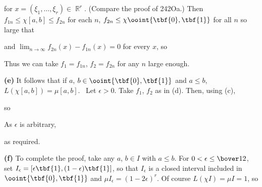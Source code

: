 { 
      
      
\noindent for $x=(\xi_1,\ldots,\xi_r)\in\BbbR^r$.   (Compare the proof 
of 242Oa.)   Then 
$f_{1n}\le\chi[a,b]\le f_{2n}$ for each $n$, 
$f_{2n}\le\chi\ooint{\tbf{0},\tbf{1}}$ for all $n$ so large that 
      
      
\noindent and $\lim_{n\to\infty}f_{2n}(x)-f_{1n}(x)=0$ for every $x$, so 
      
      
\noindent Thus we can take $f_1=f_{1n}$, $f_2=f_{2n}$ for any $n$ large 
enough.   \Qed 
      
\medskip 
      
{\bf (e)} It follows that if $a$, $b\in\ooint{\tbf{0},\tbf{1}}$ and 
$a\le b$, $L(\chi[a,b])=\mu[a,b]$.   \Prf\ Let $\epsilon>0$.   Take 
$f_1$, $f_2$ as in (d).   Then, using (c), 
      
      
      
\noindent so 
      
      
\noindent   As $\epsilon$ is arbitrary, 
      
      
\noindent as required.\ \Qed 
      
\medskip 
      
{\bf (f)} To complete the proof, take any $a$, $b\in I$ with $a\le b$. 
For $0<\epsilon\le\bover12$, set 
$I_{\epsilon}=[\epsilon\tbf{1},(1-\epsilon)\tbf{1}]$, so that 
$I_{\epsilon}$ is a closed interval included in 
$\ooint{\tbf{0},\tbf{1}}$ and $\mu I_{\epsilon}=(1-2\epsilon)^r$.   Of 
course $L(\chi I)=\mu I=1$, so 
      
      
}
